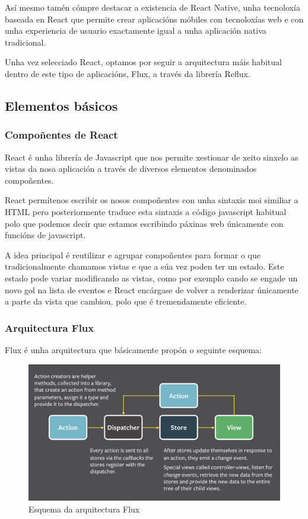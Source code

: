     Así mesmo tamén cómpre destacar a existencia de React Native, unha 
tecnoloxía baseada en React que permite crear aplicacións móbiles con 
tecnoloxías web e con unha experiencia de usuario exactamente igual a unha 
aplicación nativa tradicional.

    Unha vez selecciado React, optamos por seguir a arquitectura máis habitual 
dentro de este tipo de aplicacións, Flux, a través da librería Reflux.

    \subsection{Elementos básicos}
      \subsubsection{Compoñentes de React}
      React é unha librería de Javascript que nos permite xestionar de xeito 
sinxelo as vistas da nosa aplicación a través de diversos elementos denominados 
compoñentes.

      React permítenos escribir os nosos compoñentes con unha sintaxis moi 
similiar a HTML pero posteriormente traduce esta sintaxis a código javascript 
habitual polo que podemos decir que estamos escribindo páxinas web únicamente 
con funcións de javascript.

      A idea principal é reutilizar e agrupar compoñentes para formar o que 
tradicionalmente chamamos vistas e que a súa vez poden ter un estado.
      Este estado pode variar modificando as vistas, como por exemplo cando se 
engade un novo gol na lista de eventos e React encárgase de volver a 
renderizar únicamente a parte da vista que cambiou, polo que é tremendamente 
eficiente.

      \subsubsection{Arquitectura Flux}
      Flux é unha arquitectura que básicamente propón o seguinte esquema:

        \begin{figure}[h!]
          \begin{center}
          \includegraphics[width=\textwidth]{./img/flux.png}
          \caption{Esquema da arquitectura Flux}
          \end{center}
        \end{figure}

